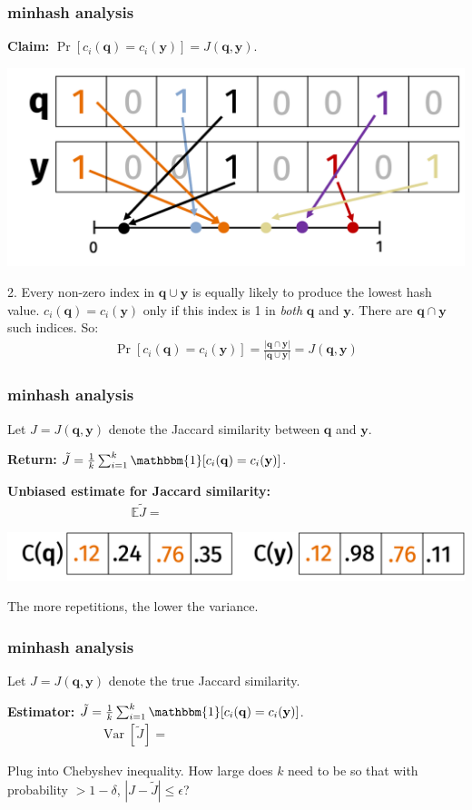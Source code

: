 \documentclass[compress]{beamer}
\newcommand{\bv}[1]{\mathbf{#1}}
\newcommand{\E}{\mathbb{E}}
\DeclareMathOperator{\Var}{Var}
\begin{document}
\begin{frame}[t]
	\frametitle{minhash analysis}
	\textbf{Claim:} $\Pr[c_i(\bv{q}) = c_i(\bv{y})] = J(\bv{q},\bv{y})$.	
	\begin{center}
		\includegraphics[width=.8\textwidth]{minhash_colored.png}
	\end{center}
	2. Every non-zero index in $\bv{q}\cup \bv{y}$ is equally likely to produce the lowest hash value.
	$c_i(\bv{q}) = c_i(\bv{y})$ only if this index is 1 in \emph{both} $\bv{q}$ and $\bv{y}$. There are $\bv{q}\cap \bv{y}$ such indices. So:
	\begin{align*}
		\Pr[c_i(\bv{q}) =c_i(\bv{y})]= \frac{|\bv{q}\cap \bv{y}|}{|\bv{q}\cup \bv{y}|}  = J(\bv{q},\bv{y})
	\end{align*}
\end{frame}


\begin{frame}
	\frametitle{minhash analysis}
	Let $J = J(\bv{q},\bv{y})$ denote the Jaccard similarity between $\bv{q}$ and $\bv{y}$. \vspace{1em}
	
	\textbf{Return:} $\tilde{J} = \frac{1}{k} \sum_{i=1}^k \mathbbm{1}[c_i(\bv{q}) = c_i(\bv{y})]$. 
	
	\textbf{Unbiased estimate for Jaccard similarity:}
	\begin{align*}
		\E \tilde{J} = \hspace{14em}
	\end{align*}
	
	\begin{center}
		\includegraphics[width=.6\textwidth]{minHashCompare.png}
	\end{center}
	The more repetitions, the lower the variance. 
\end{frame}

\begin{frame}[t]
	\frametitle{minhash analysis}
	Let $J = J(\bv{q},\bv{y})$ denote the true Jaccard similarity.
	
	\textbf{Estimator:} $\tilde{J} = \frac{1}{k} \sum_{i=1}^k \mathbbm{1}[c_i(\bv{q}) = c_i(\bv{y})]$. 
	\begin{align*}
		\Var [\tilde{J}] =\hspace{16em}
	\end{align*}
	
	Plug into Chebyshev inequality. How large does $k$ need to be so that with probability $> 1 - \delta$, $|J-\tilde{J}| \leq \epsilon$?
\end{frame}
\end{document}
